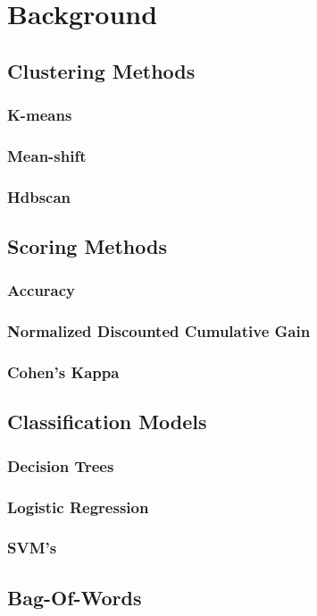\documentclass{article}
\begin{document}
\section{Background}
\subsection{Clustering Methods}
\subsubsection{K-means}
\subsubsection{Mean-shift}
\subsubsection{Hdbscan}
\subsection{Scoring Methods}
\subsubsection{Accuracy}
\subsubsection{Normalized Discounted Cumulative Gain}
\subsubsection{Cohen's Kappa}
\subsection{Classification Models}
\subsubsection{Decision Trees}\label{DecisionTrees}
\subsubsection{Logistic Regression}
\subsubsection{SVM's}
\subsection{Bag-Of-Words}\label{BOW}
\end{document}
